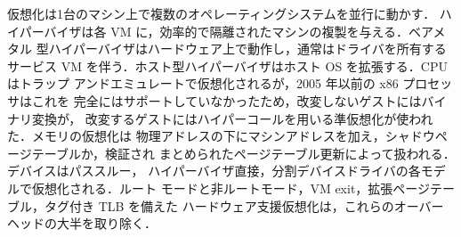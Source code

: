\documentclass[../main.tex]{subfiles}
\begin{document}
\begin{keypoint}[章のまとめ]
  仮想化は1台のマシン上で複数のオペレーティングシステムを並行に動かす．
  ハイパーバイザは各 VM に，効率的で隔離されたマシンの複製を与える．ベアメタル
  型ハイパーバイザはハードウェア上で動作し，通常はドライバを所有するサービス
  VM を伴う．ホスト型ハイパーバイザはホスト OS を拡張する．CPU はトラップ
  アンドエミュレートで仮想化されるが，2005 年以前の x86 プロセッサはこれを
  完全にはサポートしていなかったため，改変しないゲストにはバイナリ変換が，
  改変するゲストにはハイパーコールを用いる準仮想化が使われた．メモリの仮想化は
  物理アドレスの下にマシンアドレスを加え，シャドウページテーブルか，検証され
  まとめられたページテーブル更新によって扱われる．デバイスはパススルー，
  ハイパーバイザ直接，分割デバイスドライバの各モデルで仮想化される．ルート
  モードと非ルートモード，VM exit，拡張ページテーブル，タグ付き TLB を備えた
  ハードウェア支援仮想化は，これらのオーバーヘッドの大半を取り除く．
\end{keypoint}
\end{document}
